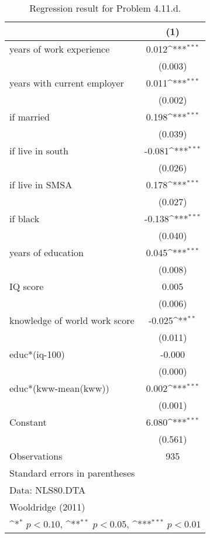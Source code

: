 \begin{table}[htbp]\centering
\def\sym#1{\ifmmode^{#1}\else\(^{#1}\)\fi}
\caption{Regression result for Problem 4.11.d. \label{reg2}}
\begin{tabular}{l*{1}{c}}
\toprule
                    &\multicolumn{1}{c}{(1)}         \\
\midrule
years of work experience&       0.012\sym{***}\\
                    &     (0.003)         \\
\addlinespace
years with current employer&       0.011\sym{***}\\
                    &     (0.002)         \\
\addlinespace
=1 if married       &       0.198\sym{***}\\
                    &     (0.039)         \\
\addlinespace
=1 if live in south &      -0.081\sym{***}\\
                    &     (0.026)         \\
\addlinespace
=1 if live in SMSA  &       0.178\sym{***}\\
                    &     (0.027)         \\
\addlinespace
=1 if black         &      -0.138\sym{***}\\
                    &     (0.040)         \\
\addlinespace
years of education  &       0.045\sym{***}\\
                    &     (0.008)         \\
\addlinespace
IQ score            &       0.005         \\
                    &     (0.006)         \\
\addlinespace
knowledge of world work score&      -0.025\sym{**} \\
                    &     (0.011)         \\
\addlinespace
educ*(iq-100)       &      -0.000         \\
                    &     (0.000)         \\
\addlinespace
educ*(kww-mean(kww))&       0.002\sym{***}\\
                    &     (0.001)         \\
\addlinespace
Constant            &       6.080\sym{***}\\
                    &     (0.561)         \\
\midrule
Observations        &         935         \\
\bottomrule
\multicolumn{2}{l}{\footnotesize Standard errors in parentheses}\\
\multicolumn{2}{l}{\footnotesize Data: NLS80.DTA}\\
\multicolumn{2}{l}{\footnotesize Wooldridge (2011)}\\
\multicolumn{2}{l}{\footnotesize \sym{*} \(p<0.10\), \sym{**} \(p<0.05\), \sym{***} \(p<0.01\)}\\
\end{tabular}
\end{table}
